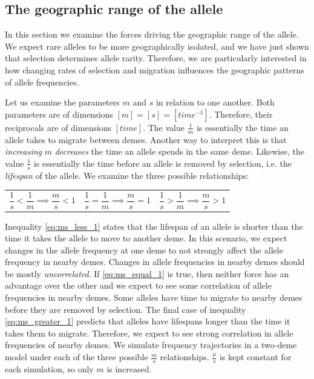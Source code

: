 \newpage
\subsection{The geographic range of the allele}
In this section we examine the forces driving the geographic range of the allele. We expect rare alleles to be more geographically isolated, and we have just shown that selection determines allele rarity. Therefore, we are particularly interested in how changing rates of selection and migration influences the geographic patterns of allele frequencies. 


Let us examine the parameters $m$ and $s$ in relation to one another. Both parameters are of dimensions $[m] = [s] = [time^{-1}]$. Therefore, their reciprocals are of dimensions $[time]$. The value $\frac{1}{m}$ is essentially the time an allele takes to migrate between demes. Another way to interpret this is that \textit{increasing} $m$ \textit{decreases} the time an allele spends in the same deme. Likewise, the value $\frac{1}{s}$ is essentially the time before an allele is removed by selection, i.e. the \textit{lifespan} of the allele. We examine the three possible relationships:

\noindent\begin{tabularx}{\textwidth}{@{}XXX@{}}
  \begin{equation} 
           \frac{1}{s} < \frac{1}{m}
    \implies \frac{m}{s} < 1 
    \label{eq:ms_less_1}
  \end{equation} &
  \begin{equation}
           \frac{1}{s} = \frac{1}{m}
    \implies \frac{m}{s} = 1 
    \label{eq:ms_equal_1}
  \end{equation} &
  \begin{equation}
           \frac{1}{s} > \frac{1}{m}
    \implies \frac{m}{s} > 1 
    \label{eq:ms_greater_1}
  \end{equation}
\end{tabularx}

Inequality \ref{eq:ms_less_1} states that the lifespan of an allele is shorter than the time it takes the allele to move to another deme. In this scenario, we expect changes in the allele frequency at one deme to not strongly affect the allele frequency in nearby demes. Changes in allele frequencies in nearby demes should be mostly \textit{uncorrelated}. If \ref{eq:ms_equal_1} is true, then neither force has an advantage over the other and we expect to see some correlation of allele frequencies in nearby demes. Some alleles have time to migrate to nearby demes before they are removed by selection. The final case of inequality \ref{eq:ms_greater_1} predicts that alleles have lifespans longer than the time it takes them to migrate. Therefore, we expect to see strong correlation in allele frequencies of nearby demes. We simulate frequency trajectories in a two-deme model under each of the three possible $\frac{m}{s}$ relationships. $\frac{\mu}{s}$ is kept constant for each simulation, so only $m$ is increased.


